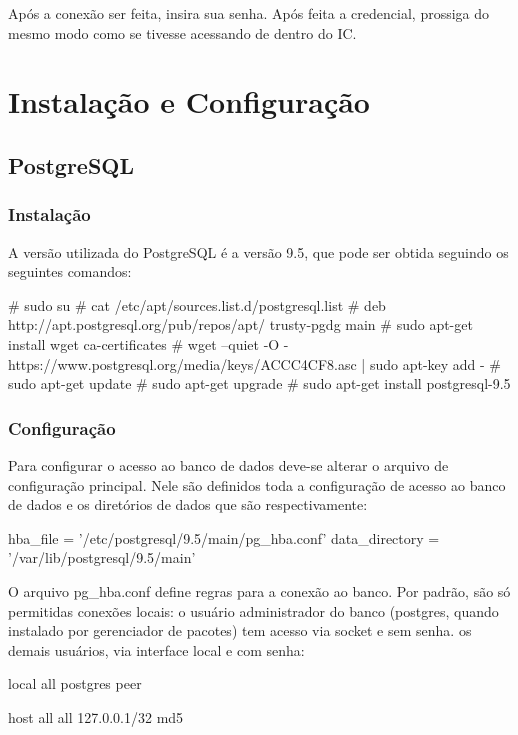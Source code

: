 \documentclass[a4paper,10pt]{article}
\begin{document}
        Após a conexão ser feita, insira sua senha. Após feita a credencial, prossiga do mesmo modo como se tivesse acessando de dentro do IC.

\section{Instalação e Configuração}
    \subsection{PostgreSQL}
        \subsubsection{Instalação}
        A versão utilizada do PostgreSQL é a versão 9.5, que pode ser obtida seguindo os seguintes comandos:
        \begin{spverbatim}
        # sudo su
        # cat /etc/apt/sources.list.d/postgresql.list
        # deb http://apt.postgresql.org/pub/repos/apt/ trusty-pgdg main
        # sudo apt-get install wget ca-certificates
        # wget --quiet -O - https://www.postgresql.org/media/keys/ACCC4CF8.asc | sudo apt-key add -
        # sudo apt-get update
        # sudo apt-get upgrade
        # sudo apt-get install postgresql-9.5

        \end{spverbatim}

        \subsubsection{Configuração}
        Para configurar o acesso ao banco de dados deve-se alterar o arquivo de configuração principal. Nele são definidos toda a configuração de acesso ao banco de dados e os diretórios de dados que são respectivamente:

        \begin{spverbatim}
        hba_file = '/etc/postgresql/9.5/main/pg_hba.conf'
        data_directory = '/var/lib/postgresql/9.5/main'
        \end{spverbatim}

        O arquivo pg\_hba.conf define regras para a conexão ao banco. Por padrão, são só permitidas conexões locais: o usuário administrador do banco (postgres, quando instalado por gerenciador de pacotes) tem acesso via socket e sem senha. os demais usuários, via interface local e com senha:
        \begin{spverbatim}
        local   all         postgres            peer

        host    all         all         127.0.0.1/32            md5
        \end{spverbatim}
\end{document}
